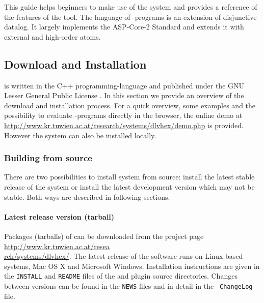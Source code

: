 \documentclass[a4paper, titlepage]{article}
\begin{document}
This guide helps beginners to make use of the system and 
provides a reference of the features of the tool. The language of \hex{}-programs is an extension of disjunctive datalog. It largely 
implements the ASP-Core-2 Standard \cite{ref} and 
extends it with external and high-order atoms. 


\subsection{Download and Installation}
\dlvhex{} is written in the C++ programming-language
and published under the GNU Lesser General 
Public License \cite{licnc}. 
In this section we provide an overview of the 
download and installation process. For a quick overview, 
some examples and the possibility to evaluate 
\hex{}-programs directly in the browser, the online demo at 
\url{http://www.kr.tuwien.ac.at/research/systems/dlvhex/demo.php} 
is provided. However the system can also be installed 
locally. 

\subsubsection{Building from source}
There are two possibilities to install \dlvhex{} system 
from source: install the latest stable release of the 
system or install the latest development version which may 
not be stable. Both ways are described in following 
sections.  

\paragraph{Latest release version (tarball)}
\label{sec:steps}
Packages (tarballs) of \dlvhex{} can be downloaded from the 
project page \url{http://www.kr.tuwien.ac.at/resea} \\ 
\url{rch/systems/dlvhex/}. The latest release of the 
software runs on Linux-based systems, Mac OS X and 
Microsoft Windows. Installation instructions are given in 
the {\tt INSTALL} and {\tt README} files of the \dlvhex{} 
and plugin source directories. Changes between versions can 
be found in the {\tt NEWS} files and in detail in the {\tt 
ChangeLog} file. 
\end{document}
